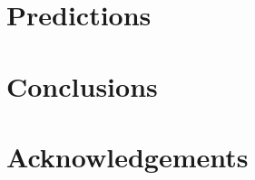 \documentclass[useAMS,usenatbib]{mn2e}
\begin{document}
\section{Predictions}
\label{sec-predictions}


\section{Conclusions}


\section{Acknowledgements}

\newcommand{\araa}{ARA\&A}   %
\newcommand{\afz}{Afz}       %
\newcommand{\aj}{AJ}         %
\newcommand{\azh}{AZh}       %
\newcommand{\aaa}{A\&A}      %
\newcommand{\aas}{A\&AS}     %
\newcommand{\aar}{A\&AR}     %
\newcommand{\apj}{ApJ}       %
\newcommand{\apjs}{ApJS}     %
\newcommand{\apjl}{ApJ}      %
\newcommand{\apss}{Ap\&SS}   %
\newcommand{\baas}{BAAS}     %
\newcommand{\jaa}{JA\&A}     %
\newcommand{\mnras}{MNRAS}   %
\newcommand{\nat}{Nat}       %
\newcommand{\pasj}{PASJ}     %
\newcommand{\pasp}{PASP}     %
\newcommand{\paspc}{PASPC}   %
\newcommand{\qjras}{QJRAS}   %
\newcommand{\sci}{Sci}       %
\newcommand{\solphys}{Solar Physics}       %
\newcommand{\sova}{SvA}      %
\newcommand{\aap}{A\&A}
\newcommand\jcap{{J. Cosmology Astropart. Phys.}}%
\newcommand{\prd}{Phys. Rev. D}

%




\label{lastpage}
\end{document}
